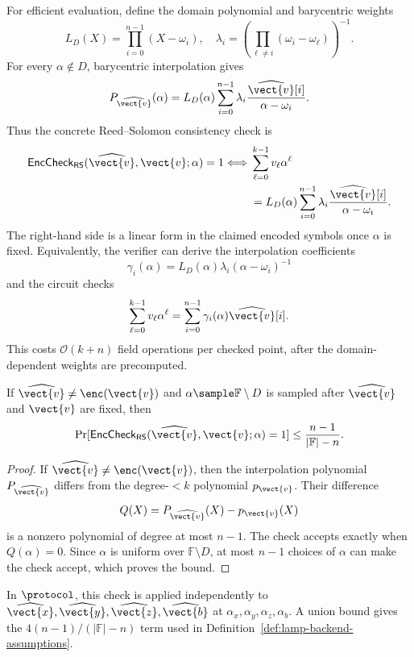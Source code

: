 For efficient evaluation, define the domain polynomial and barycentric weights
\[
  L_D(X)=\prod_{i=0}^{n-1}(X-\omega_i),
  \quad
  \lambda_i
  =
  \left(\prod_{\ell\neq i}(\omega_i-\omega_\ell)\right)^{-1}.
\]
For every \(\alpha\notin D\), barycentric interpolation gives
\[
  P_{\widehat{\vect{v}}}(\alpha)
  =
  L_D(\alpha)
  \sum_{i=0}^{n-1}
  \lambda_i
  \frac{\widehat{\vect{v}}[i]}{\alpha-\omega_i}.
\]
Thus the concrete Reed--Solomon consistency check is
\[
\begin{aligned}
\mathsf{EncCheck}_{\mathsf{RS}}
(\widehat{\vect{v}},\vect{v};\alpha)=1
\Longleftrightarrow{}&
\sum_{\ell=0}^{k-1} v_\ell \alpha^\ell
\\
&=
L_D(\alpha)
\sum_{i=0}^{n-1}
\lambda_i
\frac{\widehat{\vect{v}}[i]}{\alpha-\omega_i}.
\end{aligned}
\]
The right-hand side is a linear form in the claimed encoded symbols once
\(\alpha\) is fixed.  Equivalently, the verifier can derive the interpolation
coefficients
\[
  \gamma_i(\alpha)
  =
  L_D(\alpha)\lambda_i(\alpha-\omega_i)^{-1}
\]
and the circuit checks
\[
  \sum_{\ell=0}^{k-1} v_\ell \alpha^\ell
  =
  \sum_{i=0}^{n-1}\gamma_i(\alpha)\widehat{\vect{v}}[i].
\]
This costs \(\mathcal{O}(k+n)\) field operations per checked point, after the
domain-dependent weights are precomputed.

\begin{lemma}
\label{lem:rs-barycentric-soundness}
If \(\widehat{\vect{v}}\neq\enc(\vect{v})\) and
\(\alpha\sample\mathbb{F}\setminus D\) is sampled after
\(\widehat{\vect{v}}\) and \(\vect{v}\) are fixed, then
\[
  \Pr[
    \mathsf{EncCheck}_{\mathsf{RS}}
    (\widehat{\vect{v}},\vect{v};\alpha)=1
  ]
  \le
  \frac{n-1}{|\mathbb{F}|-n}.
\]
\end{lemma}

\begin{proof}
If \(\widehat{\vect{v}}\neq\enc(\vect{v})\), then the interpolation polynomial
\(P_{\widehat{\vect{v}}}\) differs from the degree-\(<k\) polynomial
\(p_{\vect{v}}\).  Their difference
\[
  Q(X)=P_{\widehat{\vect{v}}}(X)-p_{\vect{v}}(X)
\]
is a nonzero polynomial of degree at most \(n-1\).  The check accepts exactly
when \(Q(\alpha)=0\).  Since \(\alpha\) is uniform over
\(\mathbb{F}\setminus D\), at most \(n-1\) choices of \(\alpha\) can make the
check accept, which proves the bound.
\end{proof}

In \(\protocol\), this check is applied independently to
\(\widehat{\vect{x}},\widehat{\vect{y}},\widehat{\vect{z}},
\widehat{\vect{b}}\) at
\(\alpha_x,\alpha_y,\alpha_z,\alpha_b\).  A union bound gives the
\(4(n-1)/(|\mathbb{F}|-n)\) term used in
Definition~\ref{def:lamp-backend-assumptions}.


